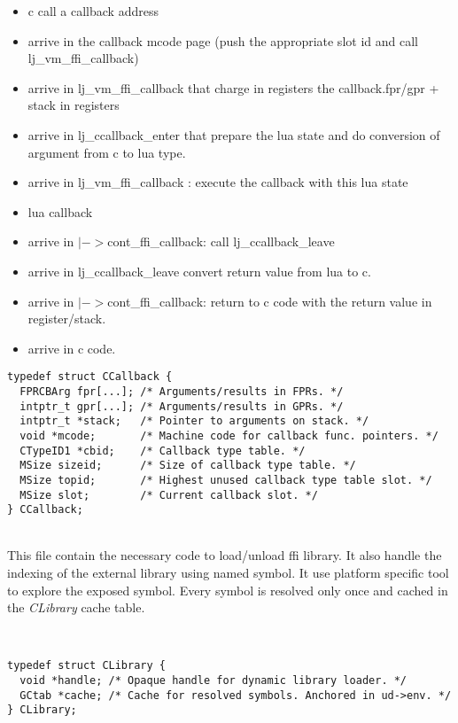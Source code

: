 \begin{itemize}
	\item c call a callback address
	\item arrive in the callback mcode page (push the appropriate slot id and call lj\_vm\_ffi\_callback)
	\item arrive in lj\_vm\_ffi\_callback that charge in registers the callback.fpr/gpr + stack in registers
	\item arrive in lj\_ccallback\_enter that prepare the lua state and do conversion of argument from c to lua type.
	\item arrive in lj\_vm\_ffi\_callback : execute the callback with this lua state
	\item lua callback
	\item arrive in $|->$cont\_ffi\_callback: call lj\_ccallback\_leave
	\item arrive in lj\_ccallback\_leave convert return value from lua to c.
	\item arrive in $|->$cont\_ffi\_callback: return to c code with the return value in register/stack.
	\item arrive in c code.
\end{itemize}

\begin{lstlisting}[style=CStyle]
typedef struct CCallback {
  FPRCBArg fpr[...]; /* Arguments/results in FPRs. */
  intptr_t gpr[...]; /* Arguments/results in GPRs. */
  intptr_t *stack;   /* Pointer to arguments on stack. */
  void *mcode;       /* Machine code for callback func. pointers. */
  CTypeID1 *cbid;    /* Callback type table. */
  MSize sizeid;      /* Size of callback type table. */
  MSize topid;       /* Highest unused callback type table slot. */
  MSize slot;        /* Current callback slot. */
} CCallback;
\end{lstlisting}

\\
This file contain the necessary code to load/unload ffi library. It also handle
the indexing of the external library using named symbol. It use platform
specific tool to explore the exposed symbol. Every symbol is resolved only once
and cached in the \emph{CLibrary} cache table.

\\
\begin{lstlisting}[style=CStyle]
typedef struct CLibrary {
  void *handle; /* Opaque handle for dynamic library loader. */
  GCtab *cache; /* Cache for resolved symbols. Anchored in ud->env. */
} CLibrary;
\end{lstlisting}
